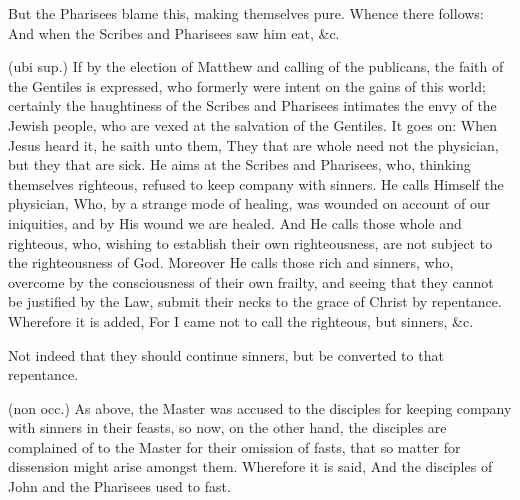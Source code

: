  But the Pharisees blame this, making themselves pure. Whence there follows: And when the Scribes and Pharisees saw him eat, \&c.

 (ubi sup.) If by the election of Matthew and calling of the publicans, the faith of the Gentiles is expressed, who formerly were intent on the gains of this world; certainly the haughtiness of the Scribes and Pharisees intimates the envy of the Jewish people, who are vexed at the salvation of the Gentiles. It goes on: When Jesus heard it, he saith unto them, They that are whole need not the physician, but they that are sick. He aims at the Scribes and Pharisees, who, thinking themselves righteous, refused to keep company with sinners. He calls Himself the physician, Who, by a strange mode of healing, was wounded on account of our iniquities, and by His wound we are healed. And He calls those whole and righteous, who, wishing to establish their own righteousness, are not subject to the righteousness of God. Moreover He calls those rich and sinners, who, overcome by the consciousness of their own frailty, and seeing that they cannot be justified by the Law, submit their necks to the grace of Christ by repentance. Wherefore it is added, For I came not to call the righteous, but sinners, \&c.

 Not indeed that they should continue sinners, but be converted to that repentance.

 

 (non occ.) As above, the Master was accused to the disciples for keeping company with sinners in their feasts, so now, on the other hand, the disciples are complained of to the Master for their omission of fasts, that so matter for dissension might arise amongst them. Wherefore it is said, And the disciples of John and the Pharisees used to fast.

